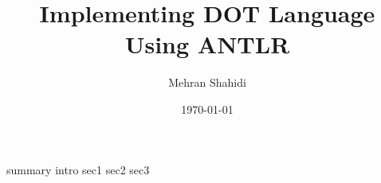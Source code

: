 \documentclass{article}
\title{Implementing DOT Language Using ANTLR}
\author{Mehran Shahidi}
\date{\today}
\begin{document}
\maketitle
{}
{summary}
\newpage
\tableofcontents
\newpage
{}
{intro}
{sec1}
{sec2}
{sec3}

\newpage
\end{document}

